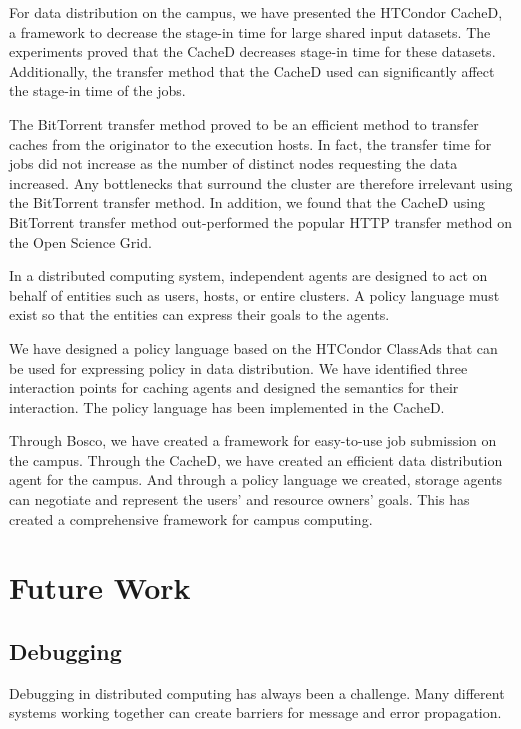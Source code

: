 For data distribution on the campus, we have presented the HTCondor CacheD, a framework to decrease the stage-in time for large shared input datasets.  The experiments proved that the CacheD decreases stage-in time for these datasets.  Additionally, the transfer method that the CacheD used can significantly affect the stage-in time of the jobs.

The BitTorrent transfer method proved to be an efficient method to transfer caches from the originator to the execution hosts.  In fact, the transfer time for jobs did not increase as the number of distinct nodes requesting the data increased.  Any bottlenecks that surround the cluster are therefore irrelevant using the BitTorrent transfer method.  In addition, we found that the CacheD using BitTorrent transfer method out-performed the popular HTTP transfer method on the Open Science Grid.

In a distributed computing system, independent agents are designed to act on behalf of entities such as users, hosts, or entire clusters.  A policy language must exist so that the entities can express their goals to the agents.  

We have designed a policy language based on the HTCondor ClassAds that can be used for expressing policy in data distribution.  We have identified three interaction points for caching agents and designed the semantics for their interaction.  The policy language has been implemented in the CacheD.

Through Bosco, we have created a framework for easy-to-use job submission on the campus.  Through the CacheD, we have created an efficient data distribution agent for the campus.  And through a policy language we created, storage agents can negotiate and represent the users' and resource owners' goals.  This has created a comprehensive framework for campus computing.

\section{Future Work}

\subsection{Debugging}
Debugging in distributed computing has always been a challenge.  Many different systems working together can create barriers for message and error propagation.

